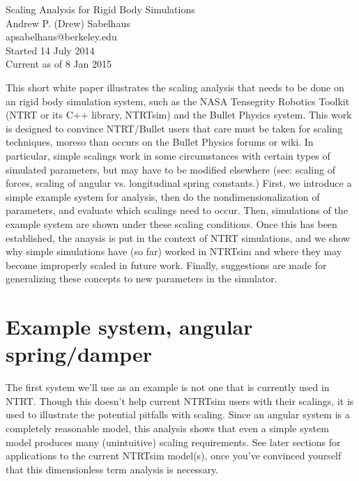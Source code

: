 \documentclass[12pt,letterpaper]{article}
\begin{document}

\begin{center}
\huge
Scaling Analysis for Rigid Body Simulations\\
\normalsize
\vspace{0.1in}
Andrew P. (Drew) Sabelhaus\\
apsabelhaus@berkeley.edu \\
Started 14 July 2014 \\
Current as of 8 Jan 2015
\end{center}


This short white paper illustrates the scaling analysis that needs to be done on an rigid body simulation system, such as the NASA Tensegrity Robotics Toolkit (NTRT or its C++ library, NTRTsim) and the Bullet Physics system.
This work is designed to convince NTRT/Bullet users that care must be taken for scaling techniques, moreso than occurs on the Bullet Physics forums or wiki.
In particular, simple scalings work in some circumstances with certain types of simulated parameters, but may have to be modified elsewhere (see: scaling of forces, scaling of angular vs. longitudinal spring constants.)
First, we introduce a simple example system for analysis, then do the nondimensionalization of parameters, and evaluate which scalings need to occur.
Then, simulations of the example system are shown under these scaling conditions.
Once this has been established, the anaysis is put in the context of NTRT simulations, and we show why simple simulations have (so far) worked in NTRTsim and where they may become improperly scaled in future work.
Finally, suggestions are made for generalizing these concepts to new parameters in the simulator.

\section{Example system, angular spring/damper}

The first system we'll use as an example is not one that is currently used in NTRT.
Though this doesn't help current NTRTsim users with their scalings, it is used to illustrate the potential pitfalls with scaling.
Since an angular system is a completely reasonable model, this analysis shows that even a simple system model produces many (unintuitive) scaling requirements.
See later sections for applications to the current NTRTsim model(s), once you've convinced yourself that this dimensionless term analysis is necessary.
\end{document}

